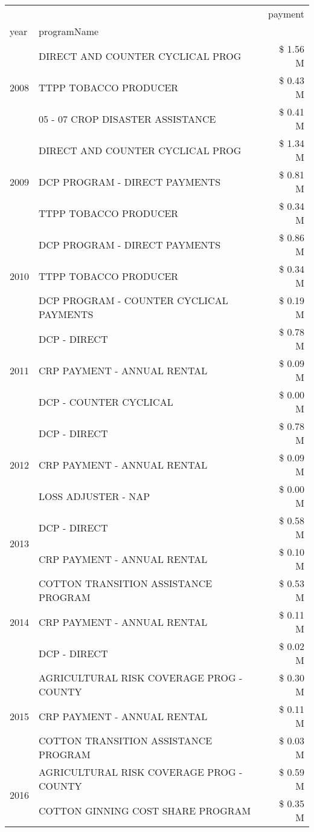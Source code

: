 \begin{tabular}{llr}
\toprule
 &  & payment \\
year & programName &  \\
\midrule
\multirow[t]{3}{*}{2008} & DIRECT AND COUNTER CYCLICAL PROG & \$ 1.56 M \\
 & TTPP TOBACCO PRODUCER & \$ 0.43 M \\
 & 05 - 07 CROP DISASTER ASSISTANCE & \$ 0.41 M \\
\cline{1-3}
\multirow[t]{3}{*}{2009} & DIRECT AND COUNTER CYCLICAL PROG & \$ 1.34 M \\
 & DCP PROGRAM - DIRECT PAYMENTS & \$ 0.81 M \\
 & TTPP TOBACCO PRODUCER & \$ 0.34 M \\
\cline{1-3}
\multirow[t]{3}{*}{2010} & DCP PROGRAM - DIRECT PAYMENTS & \$ 0.86 M \\
 & TTPP TOBACCO PRODUCER & \$ 0.34 M \\
 & DCP PROGRAM - COUNTER CYCLICAL PAYMENTS & \$ 0.19 M \\
\cline{1-3}
\multirow[t]{3}{*}{2011} & DCP - DIRECT & \$ 0.78 M \\
 & CRP PAYMENT - ANNUAL RENTAL & \$ 0.09 M \\
 & DCP - COUNTER CYCLICAL & \$ 0.00 M \\
\cline{1-3}
\multirow[t]{3}{*}{2012} & DCP - DIRECT & \$ 0.78 M \\
 & CRP PAYMENT - ANNUAL RENTAL & \$ 0.09 M \\
 & LOSS ADJUSTER - NAP & \$ 0.00 M \\
\cline{1-3}
\multirow[t]{2}{*}{2013} & DCP - DIRECT & \$ 0.58 M \\
 & CRP PAYMENT - ANNUAL RENTAL & \$ 0.10 M \\
\cline{1-3}
\multirow[t]{3}{*}{2014} & COTTON TRANSITION ASSISTANCE PROGRAM & \$ 0.53 M \\
 & CRP PAYMENT - ANNUAL RENTAL & \$ 0.11 M \\
 & DCP - DIRECT & \$ 0.02 M \\
\cline{1-3}
\multirow[t]{3}{*}{2015} & AGRICULTURAL RISK COVERAGE PROG - COUNTY & \$ 0.30 M \\
 & CRP PAYMENT - ANNUAL RENTAL & \$ 0.11 M \\
 & COTTON TRANSITION ASSISTANCE PROGRAM & \$ 0.03 M \\
\cline{1-3}
\multirow[t]{3}{*}{2016} & AGRICULTURAL RISK COVERAGE PROG - COUNTY & \$ 0.59 M \\
 & COTTON GINNING COST SHARE PROGRAM & \$ 0.35 M \\

\end{tabular}
